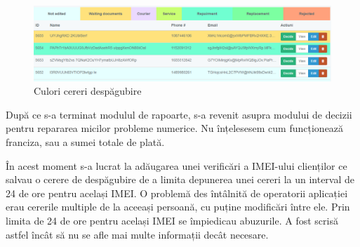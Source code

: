 	\begin{figure}
		\includegraphics[width=\linewidth]{../imagini/color_coding.png}
		\caption{Culori cereri despăgubire}
		\label{fig:color_coding}
	\end{figure}

	După ce s-a terminat modulul de rapoarte, s-a revenit asupra modului de decizii pentru repararea micilor probleme numerice.
	Nu înțelesesem cum funcționează franciza, sau a sumei totale de plată.

	În acest moment s-a lucrat la adăugarea unei verificări a IMEI-ului clienților ce salvau o cerere de despăgubire de a limita depunerea unei cereri la un interval de 24 de ore pentru același IMEI.
	O problemă des întâlnită de operatorii aplicației erau cererile multiple de la aceeași persoană, cu puține modificări între ele.
	Prin limita de 24 de ore pentru același IMEI se împiedicau abuzurile.
	A fost scrisă astfel încât să nu se afle mai multe informații decât necesare.
